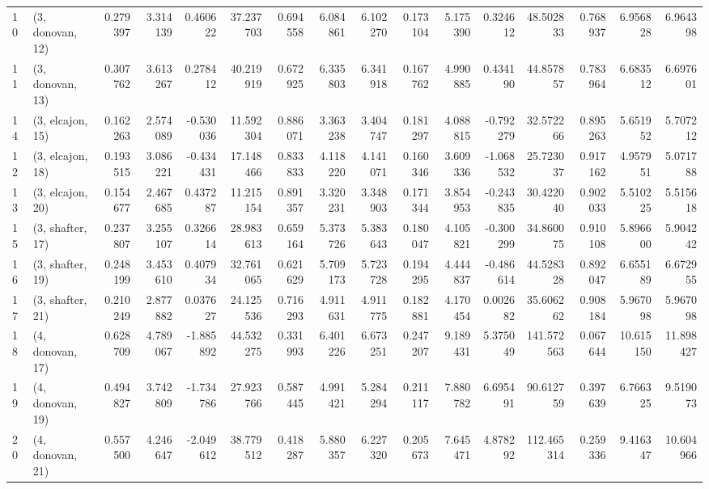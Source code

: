\begin{tabular}{llrrrrrrrrrrrrrr}
10 &  (3, donovan, 12) &   0.279397 &  3.314139 &  0.460622 &   37.237703 &  0.694558 &   6.084861 &   6.102270 &  0.173104 &  5.175390 &  0.324612 &   48.502833 &  0.768937 &   6.956828 &   6.964398 \\
11 &  (3, donovan, 13) &   0.307762 &  3.613267 &  0.278412 &   40.219919 &  0.672925 &   6.335803 &   6.341918 &  0.167762 &  4.990885 &  0.434190 &   44.857857 &  0.783964 &   6.683512 &   6.697601 \\
14 &  (3, elcajon, 15) &   0.162263 &  2.574089 & -0.530036 &   11.592304 &  0.886071 &   3.363238 &   3.404747 &  0.181297 &  4.088815 & -0.792279 &   32.572266 &  0.895263 &   5.651952 &   5.707212 \\
12 &  (3, elcajon, 18) &   0.193515 &  3.086221 & -0.434431 &   17.148466 &  0.833833 &   4.118220 &   4.141071 &  0.160346 &  3.609336 & -1.068532 &   25.723037 &  0.917162 &   4.957951 &   5.071788 \\
13 &  (3, elcajon, 20) &   0.154677 &  2.467685 &  0.437287 &   11.215154 &  0.891357 &   3.320231 &   3.348903 &  0.171344 &  3.854953 & -0.243835 &   30.422040 &  0.902033 &   5.510225 &   5.515618 \\
15 &  (3, shafter, 17) &   0.237807 &  3.255107 &  0.326614 &   28.983613 &  0.659164 &   5.373726 &   5.383643 &  0.180047 &  4.105821 & -0.300299 &   34.860075 &  0.910108 &   5.896600 &   5.904242 \\
16 &  (3, shafter, 19) &   0.248199 &  3.453610 &  0.407934 &   32.761065 &  0.621629 &   5.709173 &   5.723728 &  0.194295 &  4.444837 & -0.486614 &   44.528328 &  0.892047 &   6.655189 &   6.672955 \\
17 &  (3, shafter, 21) &   0.210249 &  2.877882 &  0.037627 &   24.125536 &  0.716293 &   4.911631 &   4.911775 &  0.182881 &  4.170454 &  0.002682 &   35.606262 &  0.908184 &   5.967098 &   5.967098 \\
18 &  (4, donovan, 17) &   0.628709 &  4.789067 & -1.885892 &   44.532275 &  0.331993 &   6.401226 &   6.673251 &  0.247207 &  9.189431 &  5.375049 &  141.572563 &  0.067644 &  10.615150 &  11.898427 \\
19 &  (4, donovan, 19) &   0.494827 &  3.742809 & -1.734786 &   27.923766 &  0.587445 &   4.991421 &   5.284294 &  0.211117 &  7.880782 &  6.695491 &   90.612759 &  0.397639 &   6.766325 &   9.519073 \\
20 &  (4, donovan, 21) &   0.557500 &  4.246647 & -2.049612 &   38.779512 &  0.418287 &   5.880357 &   6.227320 &  0.205673 &  7.645471 &  4.878292 &  112.465314 &  0.259336 &   9.416347 &  10.604966 \\

\end{tabular}
